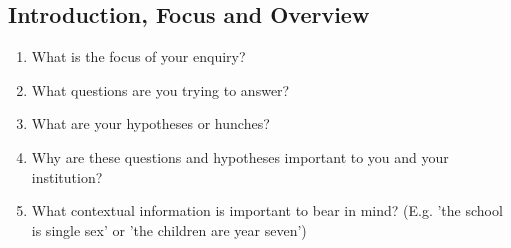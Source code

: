 \subsection{Introduction, Focus and Overview}
\begin{enumerate}
\item What is the focus of your enquiry?
\item What questions are you trying to answer?
\item What are your hypotheses or hunches?
\item Why are these questions and hypotheses important to you and your institution?
\item What contextual information is important to bear in mind? (E.g. 'the school is single sex' or 'the children are year seven')
\end{enumerate}